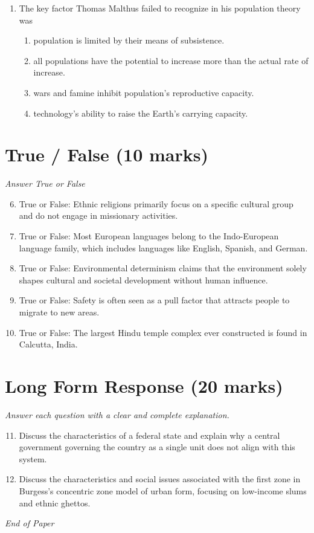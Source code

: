 \documentclass[12pt]{article}
\begin{document}
\begin{enumerate}[label=\arabic*.]
\begin{enumerate}[label=(\alph*)]
\end{enumerate}
\item The key factor Thomas Malthus failed to recognize in his population theory was
\begin{enumerate}[label=(\alph*)]
    \item population is limited by their means of subsistence.
    \item all populations have the potential to increase more than the actual rate of increase.
    \item wars and famine inhibit population's reproductive capacity.
    \item technology's ability to raise the Earth's carrying capacity.
\end{enumerate}
\end{enumerate}

\section*{True / False (10 marks)}
\textit{Answer True or False}
\begin{enumerate}[label=\arabic*.]
\setcounter{enumi}{5}
\item True or False: Ethnic religions primarily focus on a specific cultural group and do not engage in missionary activities.
\item True or False: Most European languages belong to the Indo-European language family, which includes languages like English, Spanish, and German.
\item True or False: Environmental determinism claims that the environment solely shapes cultural and societal development without human influence.
\item True or False: Safety is often seen as a pull factor that attracts people to migrate to new areas.
\item True or False: The largest Hindu temple complex ever constructed is found in Calcutta, India.
\end{enumerate}

\section*{Long Form Response (20 marks)}
\textit{Answer each question with a clear and complete explanation.}
\begin{enumerate}[label=\arabic*.]
\setcounter{enumi}{10}
\item Discuss the characteristics of a federal state and explain why a central government
governing the country as a single unit does not align with this system.
\item Discuss the characteristics and social issues associated with the first zone in Burgess's
concentric zone model of urban form, focusing on low-income slums and ethnic ghettos.
\end{enumerate}

\vfill
\noindent\textit{End of Paper}
\end{document}
